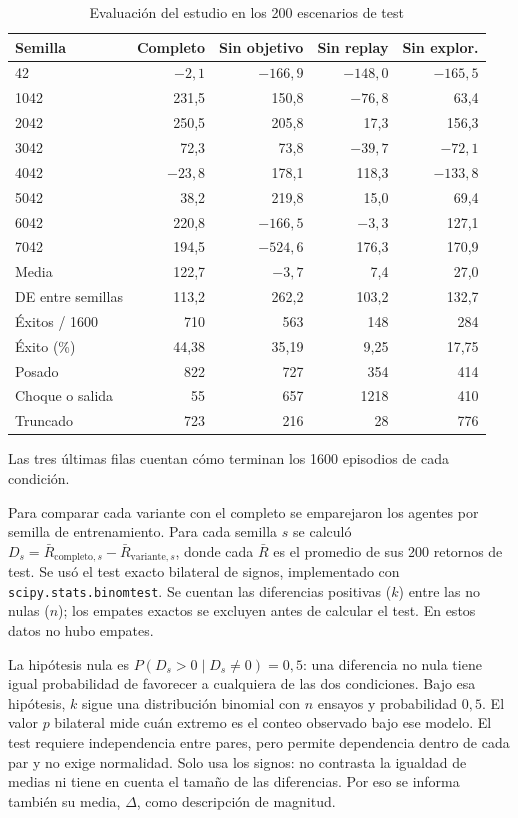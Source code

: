 \documentclass[conference]{IEEEtran}
\begin{document}
\begin{table}[t]
\caption{Evaluación del estudio en los 200 escenarios de test}
\label{tab:resultados}
\centering
\begin{tabular}{@{}lrrrr@{}}
\toprule
Semilla & Completo & Sin objetivo & Sin replay & Sin explor. \\
\midrule
42   & $-2{,}1$ & $-166{,}9$ & $-148{,}0$ & $-165{,}5$ \\
1042 & 231,5 & 150,8 & $-76{,}8$ & 63,4 \\
2042 & 250,5 & 205,8 & 17,3 & 156,3 \\
3042 & 72,3 & 73,8 & $-39{,}7$ & $-72{,}1$ \\
4042 & $-23{,}8$ & 178,1 & 118,3 & $-133{,}8$ \\
5042 & 38,2 & 219,8 & 15,0 & 69,4 \\
6042 & 220,8 & $-166{,}5$ & $-3{,}3$ & 127,1 \\
7042 & 194,5 & $-524{,}6$ & 176,3 & 170,9 \\
\midrule
Media & 122,7 & $-3{,}7$ & 7,4 & 27,0 \\
DE entre semillas & 113,2 & 262,2 & 103,2 & 132,7 \\
Éxitos / 1600 & 710 & 563 & 148 & 284 \\
Éxito (\%) & 44,38 & 35,19 & 9,25 & 17,75 \\
\midrule
Posado & 822 & 727 & 354 & 414 \\
Choque o salida & 55 & 657 & 1218 & 410 \\
Truncado & 723 & 216 & 28 & 776 \\
\bottomrule
\end{tabular}
\smallskip
\parbox{\columnwidth}{\footnotesize Las tres últimas filas cuentan cómo terminan los 1600 episodios de cada condición.}
\end{table}

Para comparar cada variante con el completo se emparejaron los agentes por semilla de entrenamiento. Para cada semilla $s$ se calculó $D_s=\bar R_{\mathrm{completo},s}-\bar R_{\mathrm{variante},s}$, donde cada $\bar R$ es el promedio de sus 200 retornos de test. Se usó el test exacto bilateral de signos, implementado con \texttt{scipy.stats.binomtest}. Se cuentan las diferencias positivas ($k$) entre las no nulas ($n$); los empates exactos se excluyen antes de calcular el test. En estos datos no hubo empates.

La hipótesis nula es $P(D_s>0\mid D_s\ne0)=0{,}5$: una diferencia no nula tiene igual probabilidad de favorecer a cualquiera de las dos condiciones. Bajo esa hipótesis, $k$ sigue una distribución binomial con $n$ ensayos y probabilidad $0{,}5$. El valor $p$ bilateral mide cuán extremo es el conteo observado bajo ese modelo. El test requiere independencia entre pares, pero permite dependencia dentro de cada par y no exige normalidad. Solo usa los signos: no contrasta la igualdad de medias ni tiene en cuenta el tamaño de las diferencias. Por eso se informa también su media, $\Delta$, como descripción de magnitud.
\end{document}
